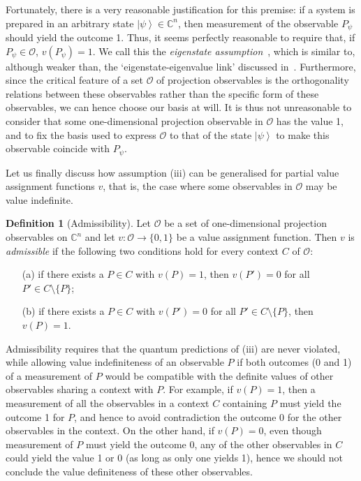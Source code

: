 \documentclass[%
 superscriptaddress,
 preprint,
 showpacs,
 showkeys,
 nofootinbib,
  amsmath,amssymb,
  aps,
  longbibliography,
  floatfix,
 ]{revtex4-1}
\theoremstyle{definition}
\newtheorem{definition}{Definition}
\newcommand{\C}{\mathbb{C}}
\newcommand{\ket}[1]{\left| #1 \right>}
\begin{document}
Fortunately, there is a very reasonable justification for this premise: if a system is prepared in an arbitrary state $\ket{\psi}\in\C^n$, then measurement of the observable $P_\psi$ should yield the outcome 1.
Thus, it seems perfectly reasonable to require that, if $P_\psi\in\mathcal{O}$, $v(P_\psi)=1$.
We call this the \emph{eigenstate assumption}~\cite{Abbott:2012fk}, which is similar to, although weaker than, the `eigenstate-eigenvalue link' discussed in~\cite{Suarez:2004gn}.
Furthermore, since the critical feature of a set $\mathcal{O}$ of projection observables is the orthogonality relations between these observables rather than the specific form of these observables, we can hence choose our basis at will.
It is thus not unreasonable to consider that some {\color{blue} one-dimensional} {\color{blue}projection} observable in $\mathcal{O}$ has the value 1, and to fix the basis used to express $\mathcal{O}$ to that of the state $\ket{\psi}$ to make this observable coincide with $P_\psi$.

Let us finally discuss how assumption (iii) can be generalised for partial value assignment functions $v$, that is, the case where some observables in $\mathcal{O}$ may be value indefinite.
\begin{definition}[Admissibility]\label{admis-rules}
	Let $\mathcal{O}$ be a set of {\color{blue} one-dimensional} projection observables on $\C^n$ and let $v:\mathcal{O}\to\{0,1\}$ be a value assignment function.
	Then $v$ is \emph{admissible} if the following two conditions hold for every context $C$ of $\mathcal{O}$:
	\begin{itemize}
		\item[(a)] if there exists a $P\in C$ with $v(P)=1$, then $v(P')=0$ for all $P'\in C\setminus\{P\}$;
		\item[(b)] if there exists a $P\in C$ with $v(P')=0$ for all $P'\in C\setminus\{P\}$, then $v(P)=1$.
	\end{itemize}
\end{definition}
Admissibility requires that the quantum predictions of (iii) are never violated, while allowing value indefiniteness of an observable $P$ if both outcomes (0 and 1) of a measurement of $P$ would be compatible with the definite values of other observables sharing a context with $P$.
For example, if $v(P)=1$, then a measurement of all the observables in a context $C$ containing $P$ must yield the outcome 1 for $P$, and hence to avoid contradiction the outcome 0 for the other observables in the context.
On the other hand, if $v(P)=0$, even though measurement of $P$ must yield the outcome 0, any of the other observables in $C$ could yield the value 1 or 0 (as long as only one yields 1), hence we should not conclude the value definiteness of these other observables.
\end{document}
